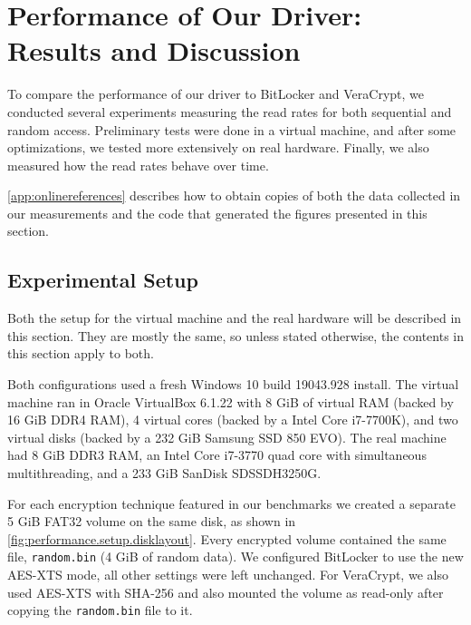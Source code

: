 \chapter{Performance of Our Driver: Results and Discussion}
\label{chap:performance}
To compare the performance of our driver to BitLocker and VeraCrypt, we conducted several experiments measuring the read rates for both sequential and random access. Preliminary tests were done in a virtual machine, and after some optimizations, we tested more extensively on real hardware. Finally, we also measured how the read rates behave over time.

\autoref{app:onlinereferences} describes how to obtain copies of both the data collected in our measurements and the code that generated the figures presented in this section.

\section{Experimental Setup}
\label{chap:performance.setup}
Both the setup for the virtual machine and the real hardware will be described in this section. They are mostly the same, so unless stated otherwise, the contents in this section apply to both.

Both configurations used a fresh Windows 10 build 19043.928 install. The virtual machine ran in Oracle VirtualBox 6.1.22 with 8 GiB of virtual RAM (backed by 16 GiB DDR4 RAM), 4 virtual cores (backed by a Intel Core i7-7700K), and two virtual disks (backed by a 232 GiB Samsung SSD 850 EVO). The real machine had 8 GiB DDR3 RAM, an Intel Core i7-3770 quad core with simultaneous multithreading, and a 233 GiB SanDisk SDSSDH3250G.

For each encryption technique featured in our benchmarks we created a separate 5 GiB FAT32 volume on the same disk, as shown in \autoref{fig:performance.setup.disklayout}. Every encrypted volume contained the same file, \texttt{random.bin} (4 GiB of random data). We configured BitLocker to use the new AES-XTS mode, all other settings were left unchanged. For VeraCrypt, we also used AES-XTS with SHA-256 and also mounted the volume as read-only after copying the \texttt{random.bin} file to it.

